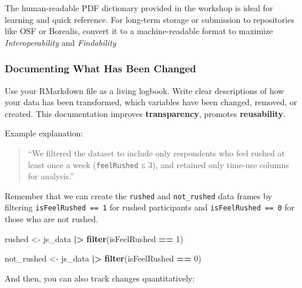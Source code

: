 \documentclass[
]{article}
\newenvironment{Shaded}{\begin{snugshade}}{\end{snugshade}}
\newcommand{\AttributeTok}[1]{\textcolor[rgb]{0.13,0.29,0.53}{#1}}
\newcommand{\ConstantTok}[1]{\textcolor[rgb]{0.56,0.35,0.01}{#1}}
\newcommand{\DecValTok}[1]{\textcolor[rgb]{0.00,0.00,0.81}{#1}}
\newcommand{\FunctionTok}[1]{\textcolor[rgb]{0.13,0.29,0.53}{\textbf{#1}}}
\newcommand{\NormalTok}[1]{#1}
\newcommand{\OtherTok}[1]{\textcolor[rgb]{0.56,0.35,0.01}{#1}}
\newcommand{\SpecialCharTok}[1]{\textcolor[rgb]{0.81,0.36,0.00}{\textbf{#1}}}
\newcommand{\StringTok}[1]{\textcolor[rgb]{0.31,0.60,0.02}{#1}}
\begin{document}
The human-readable PDF dictionary provided in the workshop is ideal for
learning and quick reference. For long-term storage or submission to
repositories like OSF or Borealis, convert it to a machine-readable
format to maximize \emph{Interoperability} and \emph{Findability}

\subsubsection{Documenting What Has Been
Changed}\label{documenting-what-has-been-changed}

Use your RMarkdown file as a living logbook. Write clear descriptions of
how your data has been transformed, which variables have been changed,
removed, or created. This documentation improves \textbf{transparency},
promotes \textbf{reusability}.

Example explanation:

\begin{quote}
``We filtered the dataset to include only respondents who feel rushed at
least once a week (\texttt{feelRushed} ≤ 3), and retained only time-use
columns for analysis.''
\end{quote}

Remember that we can create the \texttt{rushed} and \texttt{not\_rushed}
data frames by filtering \texttt{isFeelRushed\ ==\ 1} for rushed
participants and \texttt{isFeelRushed\ ==\ 0} for those who are not
rushed.

\begin{Shaded}
\begin{Highlighting}[]
\NormalTok{rushed }\OtherTok{\textless{}{-}}\NormalTok{ js\_data }\SpecialCharTok{|\textgreater{}} 
  \FunctionTok{filter}\NormalTok{(isFeelRushed }\SpecialCharTok{==} \DecValTok{1}\NormalTok{)}

\NormalTok{not\_rushed }\OtherTok{\textless{}{-}}\NormalTok{ js\_data }\SpecialCharTok{|\textgreater{}} 
  \FunctionTok{filter}\NormalTok{(isFeelRushed }\SpecialCharTok{==} \DecValTok{0}\NormalTok{)}
\end{Highlighting}
\end{Shaded}

And then, you can also track changes quantitatively:

\begin{Shaded}
\end{Shaded}
\end{document}
